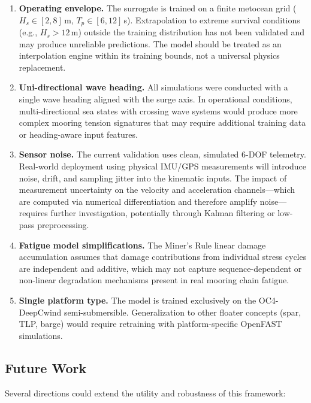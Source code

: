 \documentclass[preprint,12pt]{elsarticle}
\begin{document}
\begin{enumerate}
    \item \textbf{Operating envelope.} The surrogate is trained on a finite metocean grid ($H_s \in [2, 8]$\,m, $T_p \in [6, 12]$\,s). Extrapolation to extreme survival conditions (e.g., $H_s > 12$\,m) outside the training distribution has not been validated and may produce unreliable predictions. The model should be treated as an interpolation engine within its training bounds, not a universal physics replacement.

    \item \textbf{Uni-directional wave heading.} All simulations were conducted with a single wave heading aligned with the surge axis. In operational conditions, multi-directional sea states with crossing wave systems would produce more complex mooring tension signatures that may require additional training data or heading-aware input features.

    \item \textbf{Sensor noise.} The current validation uses clean, simulated 6-DOF telemetry. Real-world deployment using physical IMU/GPS measurements will introduce noise, drift, and sampling jitter into the kinematic inputs. The impact of measurement uncertainty on the velocity and acceleration channels---which are computed via numerical differentiation and therefore amplify noise---requires further investigation, potentially through Kalman filtering or low-pass preprocessing.

    \item \textbf{Fatigue model simplifications.} The Miner's Rule linear damage accumulation assumes that damage contributions from individual stress cycles are independent and additive, which may not capture sequence-dependent or non-linear degradation mechanisms present in real mooring chain fatigue.

    \item \textbf{Single platform type.} The model is trained exclusively on the OC4-DeepCwind semi-submersible. Generalization to other floater concepts (spar, TLP, barge) would require retraining with platform-specific OpenFAST simulations.
\end{enumerate}

\subsection{Future Work}

Several directions could extend the utility and robustness of this framework:
\end{document}

